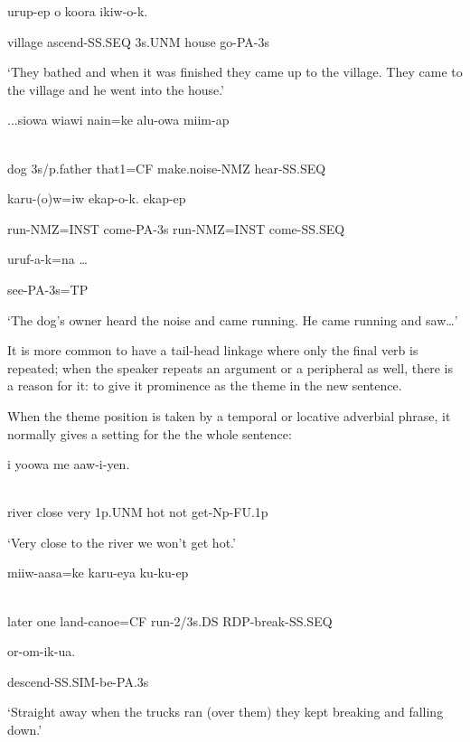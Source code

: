   urup-ep  o  koora  ikiw-o-k.

village  ascend-SS.SEQ  3s.UNM  house  go-PA-3s

`They bathed and when it was finished they came up to the village. They came to the village and he went into the house.'

\ea%
\label{ex:x1915}
\gll ...siowa  wiawi  nain=ke  alu-owa  miim-ap  \\
      \\
\glt
\z

dog  3s/p.father  that1=CF  make.noise-NMZ  hear-SS.SEQ  

karu-(o)w=iw  ekap-o-k.    ekap-ep

run-NMZ=INST  come-PA-3s  run-NMZ=INST  come-SS.SEQ  

uruf-a-k=na {\dots}

see-PA-3s=TP

`The dog's owner heard the noise and came running. He came running and saw{\dots}'

It is more common to have a tail-head linkage where only the final verb is repeated; when the speaker repeats an argument or a peripheral as well, there is a reason for it: to give it prominence as the theme in the new sentence. 

When the theme position is taken by a temporal or locative adverbial phrase, it normally gives a setting for the the whole sentence:  

\ea%
\label{ex:x1699}
\gll {}  i  yoowa  me  aaw-i-yen. \\
      \\
\glt
\z

river  close  very  1p.UNM  hot  not  get-Np-FU.1p

`Very close to the river we won't get hot.'

\ea%
\label{ex:x1916}
\gll {}  miiw-aasa=ke  karu-eya  ku-ku-ep  \\
      \\
\glt
\z

later  one  land-canoe=CF  run-2/3s.DS  RDP-break-SS.SEQ  

or-om-ik-ua.

descend-SS.SIM-be-PA.3s

`Straight away when the trucks ran (over them) they kept breaking and falling down.'

